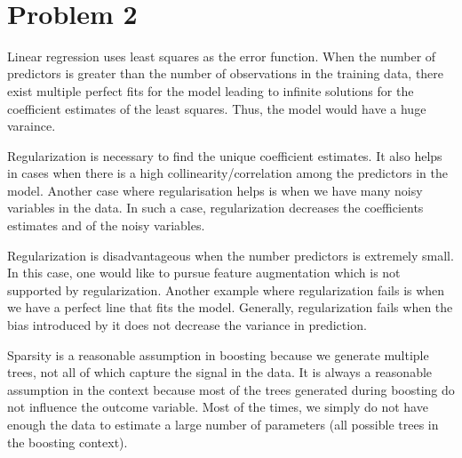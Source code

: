 \documentclass[11pt]{article}
\begin{document}
\begin{center}

\ \\
\end{center}

\section*{Problem 2}

\vspace{5 mm}
\noindent
Linear regression uses least squares as the error function. When the number of predictors is
greater than the number of observations in the training data, there exist multiple perfect fits for the
model leading to infinite solutions for the coefficient estimates of the least squares. Thus, the model
would have a huge varaince.

Regularization is necessary to find the unique coefficient estimates. It also helps in cases when there is a high 
collinearity/correlation among the predictors in the model. Another case where regularisation helps is when we
have many noisy variables in the data. In such a case, regularization decreases the coefficients estimates and of
the noisy variables. 

Regularization is disadvantageous when the number predictors is extremely small. In this case, one would like 
to pursue feature augmentation which is not supported by regularization. Another example where regularization 
fails is when we have a perfect line that fits the model. Generally, regularization fails when the bias introduced 
by it does not decrease the variance in prediction. 

Sparsity is a reasonable assumption in boosting because we generate multiple trees, not all of which 
capture the signal in the data. It is always a reasonable assumption in the context because most of the 
trees generated during boosting do not influence the outcome variable. Most of the times, we simply do
not have enough the data to estimate a large number of parameters (all possible trees in the boosting
context).


\vspace{5 mm}
\noindent
\end{document}
